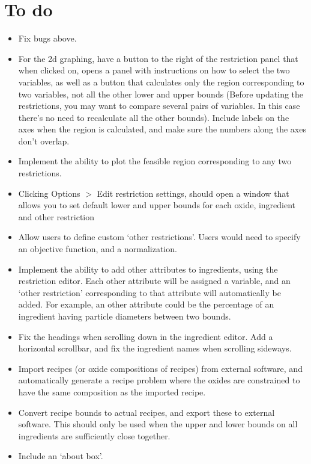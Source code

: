\documentclass[a4paper,10pt]{article}
\begin{document}
\section{To do}
\begin{itemize}
\item Fix bugs above.
\item For the 2d graphing, have a button to the right of the restriction panel that when clicked on, opens a panel with instructions on how to select the two variables, as well as a button that calculates only the region corresponding to two variables, not all the other lower and upper bounds (Before updating the restrictions, you may want to compare several pairs of variables. In this case there's no need to recalculate all the other bounds). Include labels on the axes when the region is calculated, and make sure the numbers along the axes don't overlap. 
\item Implement the ability to plot the feasible region corresponding to any two restrictions.
\item Clicking Options $>$ Edit restriction settings, should open a window that allows you to set default lower and upper bounds for each oxide, ingredient and other restriction
\item Allow users to define custom `other restrictions'. Users would need to specify an objective function, and a normalization.
\item Implement the ability to add other attributes to ingredients, using the restriction editor. Each other attribute will be assigned a variable, and an `other restriction' corresponding to that attribute will automatically be added. For example, an other attribute could be the percentage of an ingredient having particle diameters between two bounds.
\item Fix the headings when scrolling down in the ingredient editor. Add a horizontal scrollbar, and fix the ingredient names when scrolling sideways.
\item Import recipes (or oxide compositions of recipes) from external software, and automatically generate a recipe problem where the oxides are constrained to have the same composition as the imported recipe.
\item Convert recipe bounds to actual recipes, and export these to external software. This should only be used when the upper and lower bounds on all ingredients are sufficiently close together.
\item Include an `about box'. 
\end{itemize}
\end{document}
